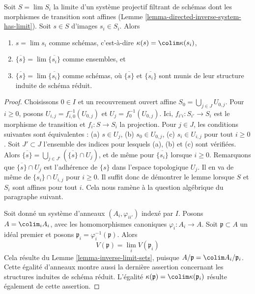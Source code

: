 \begin{lemma}
\label{lemma-inverse-limit-irreducibles}
Soit $S = \lim S_i$ la limite d'un système projectif filtrant de schémas
dont les morphismes de transition sont affines
(Lemme \ref{lemma-directed-inverse-system-has-limit}). Soit $s \in S$
d'images $s_i \in S_i$. Alors
\begin{enumerate}
\item $s = \lim s_i$ comme schémas, c'est-à-dire
$\kappa(s) = \colim \kappa(s_i)$,
\item $\overline{\{s\}} = \lim \overline{\{s_i\}}$ comme ensembles, et
\item $\overline{\{s\}} = \lim \overline{\{s_i\}}$ comme schémas, où
$\overline{\{s\}}$ et $\overline{\{s_i\}}$ sont munis de leur structure
induite de schéma réduit.
\end{enumerate}
\end{lemma}

\begin{proof}
Choisissons $0 \in I$ et un recouvrement ouvert affine
$S_0 = \bigcup_{j \in J} U_{0, j}$. Pour $i \geq 0$, posons
$U_{i, j} = f_{i, 0}^{-1}(U_{0, j})$ et
$U_j = f_0^{-1}(U_{0, j})$. Ici, $f_{i'i} : S_{i'} \to S_i$ est le
morphisme de transition et $f_i : S \to S_i$ la projection. Pour
$j \in J$, les conditions suivantes sont équivalentes :
(a) $s \in U_j$, (b) $s_0 \in U_{0, j}$,
(c) $s_i \in U_{i, j}$ pour tout $i \geq 0$. Soit $J' \subset J$
l'ensemble des indices pour lesquels (a), (b) et (c) sont vérifiées.
Alors $\overline{\{s\}} = \bigcup_{j \in J'} (\overline{\{s\}} \cap U_j)$,
et de même pour $\overline{\{s_i\}}$ lorsque $i \geq 0$. Remarquons que
$\overline{\{s\}} \cap U_j$ est l'adhérence de $\{s\}$ dans l'espace
topologique $U_j$. Il en va de même de
$\overline{\{s_i\}} \cap U_{i, j}$ pour $i \geq 0$. Il suffit donc de
démontrer le lemme lorsque $S$ et $S_i$ sont affines pour tout $i$. Cela nous
ramène à la question algébrique du paragraphe suivant.

\medskip\noindent
Soit donné un système d'anneaux $(A_i, \varphi_{ii'})$ indexé par $I$.
Posons $A = \colim_i A_i$, avec les homomorphismes canoniques
$\varphi_i : A_i \to A$. Soit $\mathfrak p \subset A$ un idéal premier et
posons $\mathfrak p_i = \varphi_i^{-1}(\mathfrak p)$. Alors
$$
V(\mathfrak p) = \lim_i V(\mathfrak p_i)
$$
Cela résulte du Lemme \ref{lemma-inverse-limit-sets}, puisque
$A/\mathfrak p = \colim A_i/\mathfrak p_i$. Cette égalité d'anneaux montre
aussi la dernière assertion concernant les structures induites de schéma
réduit. L'égalité $\kappa(\mathfrak p) = \colim \kappa(\mathfrak p_i)$
résulte également de cette assertion.
\end{proof}


